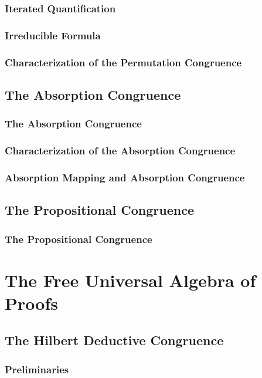 \documentclass{report}
\begin{document}
    \subsection{Iterated Quantification}
      
    \subsection{Irreducible Formula}
      
    \subsection{Characterization of the Permutation Congruence}
      
\section{The Absorption Congruence}
    \subsection{The Absorption Congruence}
      
    \subsection{Characterization of the Absorption Congruence}
      
    \subsection{Absorption Mapping and Absorption Congruence}
      
\section{The Propositional Congruence}
    \subsection{The Propositional Congruence}
      
\chapter{The Free Universal Algebra of Proofs}
\section{The Hilbert Deductive Congruence}
    \subsection{Preliminaries}
      
\end{document}
